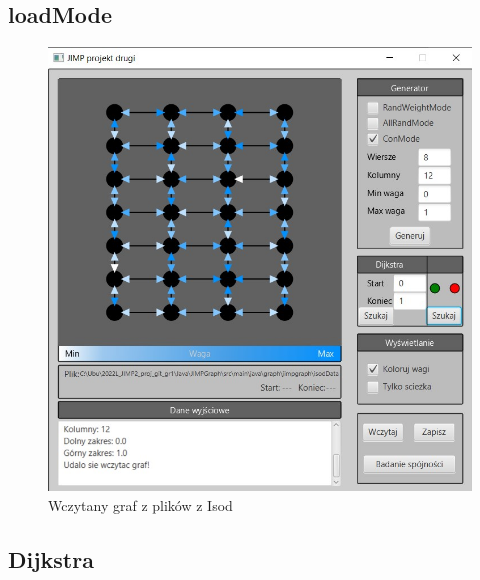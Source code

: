 \documentclass{article}
\begin{document}
\subsection{loadMode}

 \begin{figure}[h]
\centering
\includegraphics[width=1\textwidth]{Screenshot_585.jpg}
\caption{\label{fig:mod}Wczytany graf z plików z Isod}
\end{figure}
\pagebreak
\subsection{Dijkstra}
\end{document}
